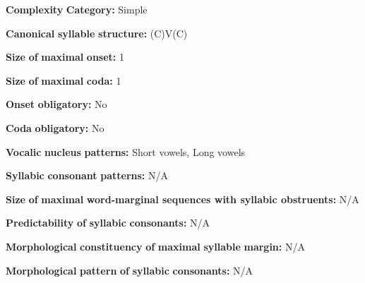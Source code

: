 \begin{styleBody}
\textbf{Complexity} \textbf{Category:} Simple
\end{styleBody}

\begin{styleBody}
\textbf{Canonical} \textbf{syllable} \textbf{structure:} (C)V(C) \citep[21-22]{Yumitani1998}
\end{styleBody}

\begin{styleBody}
\textbf{Size} \textbf{of} \textbf{maximal} \textbf{onset:} 1
\end{styleBody}

\begin{styleBody}
\textbf{Size} \textbf{of} \textbf{maximal} \textbf{coda:} 1
\end{styleBody}

\begin{styleBody}
\textbf{Onset} \textbf{obligatory:} No
\end{styleBody}

\begin{styleBody}
\textbf{Coda} \textbf{obligatory:} No
\end{styleBody}

\begin{styleBody}
\textbf{Vocalic} \textbf{nucleus} \textbf{patterns:} Short vowels, Long vowels
\end{styleBody}

\begin{styleBody}
\textbf{Syllabic} \textbf{consonant} \textbf{patterns:} N/A
\end{styleBody}

\begin{styleBody}
\textbf{Size} \textbf{of} \textbf{maximal} \textbf{word{}-marginal sequences with syllabic obstruents:} N/A
\end{styleBody}

\begin{styleBody}
\textbf{Predictability} \textbf{of} \textbf{syllabic} \textbf{consonants:} N/A
\end{styleBody}

\begin{styleBody}
\textbf{Morphological} \textbf{constituency} \textbf{of} \textbf{maximal} \textbf{syllable} \textbf{margin:} N/A
\end{styleBody}

\begin{styleBody}
\textbf{Morphological} \textbf{pattern} \textbf{of} \textbf{syllabic} \textbf{consonants:} N/A
\end{styleBody}

